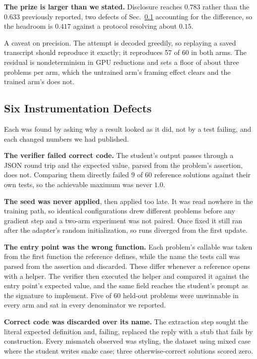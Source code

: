 \documentclass[conference]{IEEEtran}
\begin{document}
\textbf{The prize is larger than we stated.} Disclosure reaches $0.783$ rather
than the $0.633$ previously reported, two defects of Sec.~\ref{sec:instrument}
accounting for the difference, so the headroom is $0.417$ against a protocol
resolving about $0.15$.

A caveat on precision. The attempt is decoded greedily, so replaying a saved
transcript should reproduce it exactly; it reproduces 57 of 60 in both arms.
The residual is nondeterminism in GPU reductions and sets a floor of about
three problems per arm, which the untrained arm's framing effect clears and the
trained arm's does not.

\subsection{Six Instrumentation Defects}
\label{sec:instrument}

Each was found by asking why a result looked as it did, not by a test failing,
and each changed numbers we had published.

\textbf{The verifier failed correct code.} The student's output passes through a
JSON round trip and the expected value, parsed from the problem's assertion,
does not. Comparing them directly failed 9 of 60 reference solutions against
their own tests, so the achievable maximum was never $1.0$.

\textbf{The seed was never applied}, then applied too late. It was read nowhere
in the training path, so identical configurations drew different problems before
any gradient step and a two-arm experiment was not paired. Once fixed it still
ran after the adapter's random initialization, so runs diverged from the first
update.

\textbf{The entry point was the wrong function.} Each problem's callable was
taken from the first function the reference defines, while the name the tests
call was parsed from the assertion and discarded. These differ whenever a
reference opens with a helper. The verifier then executed the helper and
compared it against the entry point's expected value, and the same field reaches
the student's prompt as the signature to implement. Five of 60 held-out
problems were unwinnable in every arm and sat in every denominator we reported.

\textbf{Correct code was discarded over its name.} The extraction step sought
the literal expected definition and, failing, replaced the reply with a stub
that fails by construction. Every mismatch observed was styling, the dataset
using mixed case where the student writes snake case; three otherwise-correct
solutions scored zero.
\end{document}
